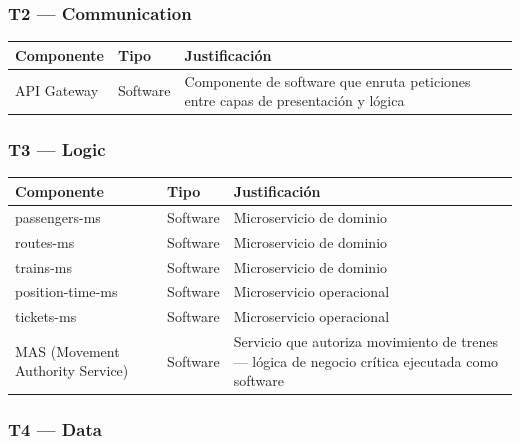 \documentclass[a4paper, 10 pt]{article}
\begin{document}
\subsubsection{T2 --- Communication}

\begin{table}[H]
\centering
\footnotesize
\begin{tabular}{|R{0.15\textwidth}|M{0.1\textwidth}|R{0.55\textwidth}|}
\hline
\textbf{Componente} & \textbf{Tipo} & \textbf{Justificación} \\
\hline
API Gateway & Software & Componente de software que enruta peticiones entre capas de presentación y lógica \\
\hline
\end{tabular}
\end{table}

\subsubsection{T3 --- Logic}

\begin{table}[H]
\centering
\footnotesize
\begin{tabular}{|R{0.15\textwidth}|M{0.1\textwidth}|R{0.55\textwidth}|}
\hline
\textbf{Componente} & \textbf{Tipo} & \textbf{Justificación} \\
\hline
passengers-ms & Software & Microservicio de dominio \\
\hline
routes-ms & Software & Microservicio de dominio \\
\hline
trains-ms & Software & Microservicio de dominio \\
\hline
position-time-ms & Software & Microservicio operacional \\
\hline
tickets-ms & Software & Microservicio operacional \\
\hline
MAS (Movement Authority Service) & Software & Servicio que autoriza movimiento de trenes --- lógica de negocio crítica ejecutada como software \\
\hline
\end{tabular}
\end{table}

\subsubsection{T4 --- Data}
\end{document}
